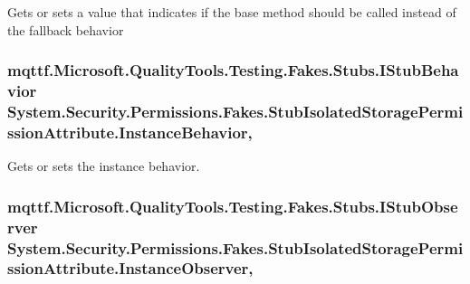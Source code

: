 Gets or sets a value that indicates if the base method should be called instead of the fallback behavior

\hypertarget{class_system_1_1_security_1_1_permissions_1_1_fakes_1_1_stub_isolated_storage_permission_attribute_ac04c9d0ae5210d582ebcbedff35b34eb}{
\subsubsection[{Instance\-Behavior}]{\setlength{\rightskip}{0pt plus 5cm}mqttf.\-Microsoft.\-Quality\-Tools.\-Testing.\-Fakes.\-Stubs.\-I\-Stub\-Behavior System.\-Security.\-Permissions.\-Fakes.\-Stub\-Isolated\-Storage\-Permission\-Attribute.\-Instance\-Behavior\hspace{0.3cm}{\ttfamily [get]}, {\ttfamily [set]}}}\label{class_system_1_1_security_1_1_permissions_1_1_fakes_1_1_stub_isolated_storage_permission_attribute_ac04c9d0ae5210d582ebcbedff35b34eb}


Gets or sets the instance behavior.

\hypertarget{class_system_1_1_security_1_1_permissions_1_1_fakes_1_1_stub_isolated_storage_permission_attribute_a4c84a0dcc768b917382c7e015a42b4c8}{
\subsubsection[{Instance\-Observer}]{\setlength{\rightskip}{0pt plus 5cm}mqttf.\-Microsoft.\-Quality\-Tools.\-Testing.\-Fakes.\-Stubs.\-I\-Stub\-Observer System.\-Security.\-Permissions.\-Fakes.\-Stub\-Isolated\-Storage\-Permission\-Attribute.\-Instance\-Observer\hspace{0.3cm}{\ttfamily [get]}, {\ttfamily [set]}}}\label{class_system_1_1_security_1_1_permissions_1_1_fakes_1_1_stub_isolated_storage_permission_attribute_a4c84a0dcc768b917382c7e015a42b4c8}


